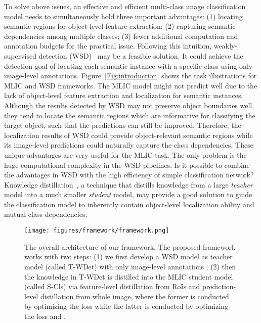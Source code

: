 \documentclass[sigconf,natbib=false]{acmart}
\begin{document}
To solve above issues, an effective and efficient multi-class image classification model needs to simultaneously hold three important advantages: (1) locating semantic regions for object-level feature extraction; (2) capturing semantic dependencies among multiple classes; (3) fewer additional computation and annotation budgets for the practical issue.
Following this intuition, weakly-supervised detection (WSD)~\cite{WSD2_cvpr16_ha} may be a feasible solution.
It could achieve the detection goal of locating each semantic instance with a specific class using only image-level annotations.
Figure~\ref{Fig:introduction} shows the task illustrations for MLIC and WSD frameworks.
The MLIC model might not predict well due to the lack of object-level feature extraction and localization for semantic instances.
Although the results detected by WSD may not preserve object boundaries well, they tend to locate the semantic regions which are informative for classifying the target object, such that the predictions can still be improved.
Therefore, the localization results of WSD could provide object-relevant semantic regions while its image-level predictions could naturally capture the class dependencies.
These unique advantages are very useful for the MLIC task.
The only problem is the huge computational complexity in the WSD pipelines.
Is it possible to combine the advantages in WSD with the high efficiency of simple classification network?
Knowledge distillation~\cite{KD1_nips15_goj}, a technique that distills knowledge from a large \emph{teacher} model into a much smaller \emph{student} model, may provide a good solution to guide the classification model to inherently contain object-level localization ability and mutual class dependencies.



\begin{figure*}[t]
\centerline{\texttt{[image: figures/framework/framework.png]}}
\vspace{-11pt}\caption{\small The overall architecture of our framework. The proposed framework works with two steps: (1) we first develop a WSD model as teacher model (called T-WDet) with only image-level annotations ; (2) then the knowledge in T-WDet is distilled into the MLIC student model (called S-Cls) via feature-level distillation from RoIs and prediction-level distillation from whole image, where the former is conducted by optimizing the loss  while the latter is conducted by optimizing the loss  and .}
\label{Fig:overall_architecture}
\vspace{-11pt}
\end{figure*}
\end{document}
